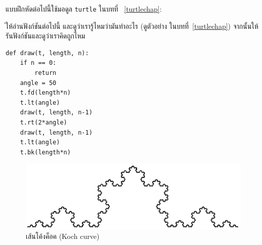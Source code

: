 แบบฝึกหัดต่อไปนี้ใช้มอดูล {\tt turtle} ในบทที่ ~\ref{turtlechap}:

\begin{exercise}

่ให้อ่านฟังก์ชันต่อไปนี้ และดูว่าเรารู้ไหมว่ามันทำอะไร (ดูตัวอย่าง
ในบทที่~\ref{turtlechap}) จากนั้นให้รันฟังก์ชันและดูว่าเราคิดถูกไหม

\begin{verbatim}
def draw(t, length, n):
    if n == 0:
        return
    angle = 50
    t.fd(length*n)
    t.lt(angle)
    draw(t, length, n-1)
    t.rt(2*angle)
    draw(t, length, n-1)
    t.lt(angle)
    t.bk(length*n)
\end{verbatim}

\end{exercise}


\begin{figure}
\centerline
{\includegraphics[scale=0.8]{figs/koch.pdf}}
\caption{เส้นโค้งค็อค (Koch curve)}
\label{fig.koch}
\end{figure}

